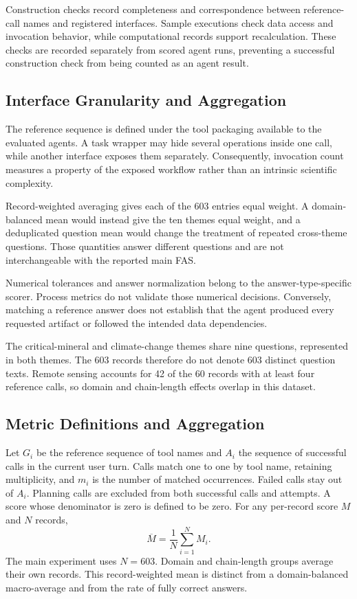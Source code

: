 Construction checks record completeness and correspondence between reference-call names and registered interfaces. Sample executions check data access and invocation behavior, while computational records support recalculation. These checks are recorded separately from scored agent runs, preventing a successful construction check from being counted as an agent result.

\subsection{Interface Granularity and Aggregation}
The reference sequence is defined under the tool packaging available to the evaluated agents. A task wrapper may hide several operations inside one call, while another interface exposes them separately. Consequently, invocation count measures a property of the exposed workflow rather than an intrinsic scientific complexity.

Record-weighted averaging gives each of the 603 entries equal weight. A domain-balanced mean would instead give the ten themes equal weight, and a deduplicated question mean would change the treatment of repeated cross-theme questions. Those quantities answer different questions and are not interchangeable with the reported main FAS.

Numerical tolerances and answer normalization belong to the answer-type-specific scorer. Process metrics do not validate those numerical decisions. Conversely, matching a reference answer does not establish that the agent produced every requested artifact or followed the intended data dependencies.

The critical-mineral and climate-change themes share nine questions, represented in both themes. The 603 records therefore do not denote 603 distinct question texts. Remote sensing accounts for 42 of the 60 records with at least four reference calls, so domain and chain-length effects overlap in this dataset.

\subsection{Metric Definitions and Aggregation}
\label{app:metric-details}
Let $G_i$ be the reference sequence of tool names and $A_i$ the sequence of successful calls in the current user turn. Calls match one to one by tool name, retaining multiplicity, and $m_i$ is the number of matched occurrences. Failed calls stay out of $A_i$. Planning calls are excluded from both successful calls and attempts. A score whose denominator is zero is defined to be zero. For any per-record score $M$ and $N$ records,
\begin{equation}
\overline{M}=\frac{1}{N}\sum_{i=1}^{N}M_i.
\label{eq:metric-mean}
\end{equation}
The main experiment uses $N=603$. Domain and chain-length groups average their own records. This record-weighted mean is distinct from a domain-balanced macro-average and from the rate of fully correct answers.

